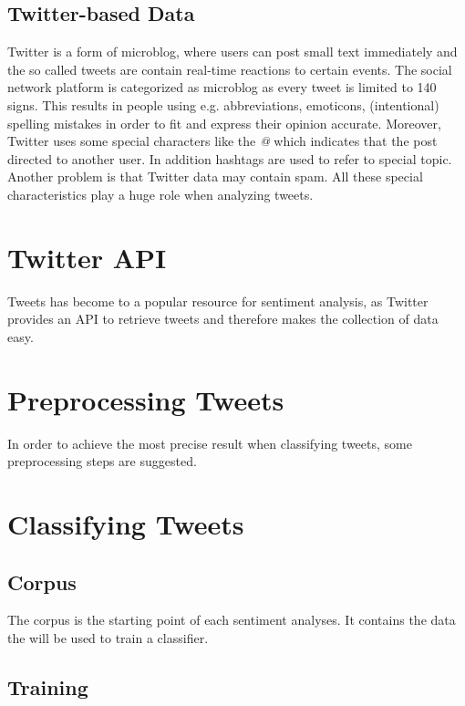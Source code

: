 \documentclass{acm_proc_article-sp}
\begin{document}
\subsection{Twitter-based Data}
Twitter is a form of microblog, where users can post small text immediately and the so called tweets are contain real-time reactions to certain events. The social network platform is categorized as microblog as every tweet is limited to 140 signs. This results in people using e.g. abbreviations, emoticons, (intentional) spelling mistakes in order to fit and express their opinion accurate. Moreover, Twitter uses some special characters like the \emph{@} which indicates that the post directed to another user. In addition hashtags are used to refer to special topic.
Another problem is that Twitter data may contain spam. All these special characteristics play a huge role when analyzing tweets. \cite{agarwal2011sentiment, read2005using}


\section{Twitter API} \label{twitterapi}
Tweets has become to a popular resource for sentiment analysis, as Twitter provides an API to retrieve tweets and therefore makes the collection of data easy.


\section{Preprocessing Tweets} \label{preprocessing}
In order to achieve the most precise result when classifying tweets, some preprocessing steps are suggested.




\section{Classifying Tweets} \label{classification}

\subsection{Corpus}
The corpus is the starting point of each sentiment analyses. It contains the data the will be used to train a classifier.


\subsection{Training}
\end{document}
